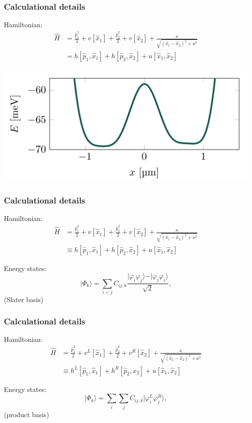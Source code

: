 \documentclass{beamer}
\begin{document}
\begin{frame}
\frametitle{Calculational details}

Hamiltonian:
\begin{align}
\hat{H} &= \frac{\hat{p}_1^2}{2} + v[\hat{x}_1] + \frac{\hat{p}_2^2}{2} + v[\hat{x}_2] + \frac{\kappa}{\sqrt{(\hat{x}_1-\hat{x}_2)^2 + a^2}}\\
&= h[\hat{p}_1,\hat{x}_1] + h[\hat{p}_2,\hat{x}_2] + u[\hat{x}_1,\hat{x}_2]
\end{align}

\vspace{6mm}

\centerline{\includegraphics[width=0.8\linewidth]{qcfigures/wells.png}}

\vspace{6mm}
\end{frame}

\begin{frame}
\frametitle{Calculational details}

Hamiltonian:
\begin{align}
\hat{H} &= \frac{\hat{p}_1^2}{2} + v[\hat{x}_1] + \frac{\hat{p}_2^2}{2} + v[\hat{x}_2] + \frac{\kappa}{\sqrt{(\hat{x}_1-\hat{x}_2)^2 + a^2}} \\
&\equiv h[\hat{p}_1,\hat{x}_1] + h[\hat{p}_2,\hat{x}_2] + u[\hat{x}_1,\hat{x}_2]
\end{align}

Energy states:
\begin{equation}
\vert\Phi_k\rangle = \sum_{i < j} C_{ij, k}\frac{\vert \varphi_i \varphi_j\rangle - \vert \varphi_j \varphi_i\rangle}{\sqrt{2}},
\end{equation}
(Slater basis)
\end{frame}

\begin{frame}
\frametitle{Calculational details}

Hamiltonian:
\begin{align}
\hat{H} &= \frac{\hat{p}_1^2}{2} + v^L[\hat{x}_1] + \frac{\hat{p}_2^2}{2} + v^R[\hat{x}_2] + \frac{\kappa}{\sqrt{(\hat{x}_1-\hat{x}_2)^2 + a^2}} \\
&\equiv h^L[\hat{p}_1,\hat{x}_1] + h^R[\hat{p}_2,\hat{x}_2] + u[\hat{x}_1,\hat{x}_2]
\end{align}

Energy states:
\begin{equation}
\vert\Phi_k\rangle = \sum_{i} \sum_{j} C_{ij, k}\vert \varphi^L_i \varphi^R_j\rangle,
\end{equation}
(product basis)
\end{frame}
\end{document}

